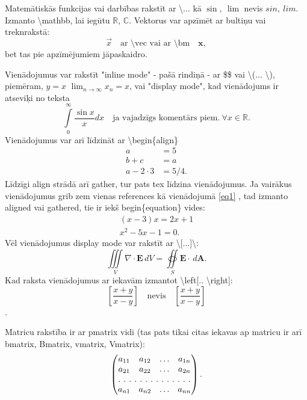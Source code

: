 \documentclass[12pt]{report}%
\theoremstyle{definition}
\newcommand*{\SavedEqref}{}%
\let\SavedEqref\eqref
\renewcommand*{\eqref}[1]{%
  \begingroup
    \hypersetup{
      linkcolor=blue,
      linkbordercolor=black,
    }%
    \SavedEqref{#1}%
  \endgroup
}%
\begin{document}
Matemātiskās funkcijas vai darbības rakstīt ar \textbackslash... kā $ \sin,\ \lim$ nevis $sin,\ lim$. Izmanto \textbackslash mathbb, lai iegūtu $\mathbb{R}$, $\mathbb{C}$. Vektorus var apzīmēt ar bultiņu vai treknrakstā: \[\vec{x}\quad \text{ar \textbackslash vec vai ar \textbackslash bm}\quad \bm{x},\] bet tas pie apzīmējumiem jāpaskaidro.

Vienādojumus var rakstīt "inline mode" - pašā rindiņā - ar \$\$  vai \textbackslash(... \textbackslash), piemēram, $y = x$ \( \lim_{n\xrightarrow{}\infty} x_n = x\), vai "display mode", kad vienādojums ir atseviķi no teksta
\begin{equation}
    \int\limits_{0}^{\infty}\frac{\sin x}{x}dx \quad \text{ja vajadzīgs komentārs piem.}\ \forall  x\in \mathbb{R}.
\end{equation}
Vienādojumus var arī līdzināt ar \textbackslash begin\{align\}
\begin{align}
	a &= 5 \\
	b + c &= a \\
	a -2\cdot3 &= 5/4.
\end{align}
Līdzīgi align strādā arī gather, tur pats tex līdzina vienādojumus. Ja vairākus vienādojumus grib zem vienas references kā vienādojumā \eqref{eq1}, tad izmanto aligned vai gathered, tie ir iekš begin\{equation\} vides:
\begin{equation}
    \begin{gathered}
    (x-3)x = 2x+1\\
    x^2-5x-1 = 0.
    \end{gathered}
    \label{eq1}
\end{equation}
Vēl vienādojumus display mode var rakstīt ar \textbackslash[...]\textbackslash: \[ \iiint\limits_V \nabla\cdot \bm{E}\,dV = \oiint\limits_S \bm{E}\cdot \, d\bm{A}.\]
Kad raksta vienādojumus ar iekavām izmantot \textbackslash left[.. \textbackslash right]:
\begin{equation}
    \left[\frac{x+y}{x-y}\right]\quad \text{nevis}\quad [\frac{x+y}{x-y}]
\end{equation}.

Matricu rakstība ir ar pmatrix vidi (tas pats tikai citas iekavas ap matricu ir arī bmatrix, Bmatrix, vmatrix, Vmatrix): 
\begin{equation}
\begin{pmatrix}
a_{11}&a_{12}&\dots&a_{1n}\\
a_{21}&a_{22}&\dots&a_{2n}\\
\hdotsfor[2]{4}\\
a_{n1}&a_{n2}&\dots&a_{nn}
\end{pmatrix}.
\end{equation}
\end{document}
